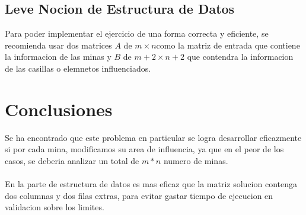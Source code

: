 \documentclass[12pt]{article}
\begin{document}
\subsection{Leve Nocion de Estructura de Datos}
Para poder implementar el ejercicio de una forma correcta y eficiente, se recomienda usar dos matrices $A$ de ${m}\times{n}$como la matriz de entrada que contiene la informacion de las minas y $B$ de ${m+2}\times{n+2}$ que contendra la informacion de las casillas o elemnetos influenciados. 
\section{Conclusiones}
Se ha encontrado que este problema en particular se logra desarrollar eficazmente si por cada mina, modificamos su area de influencia, ya que en el peor de los casos, se deberia analizar un total de $m*n$ numero de minas.
\paragraph{}
En la parte de estructura de datos es mas eficaz que la matriz solucion contenga dos columnas y dos filas extras, para evitar gastar tiempo de ejecucion en validacion sobre los limites.
\end{document}
